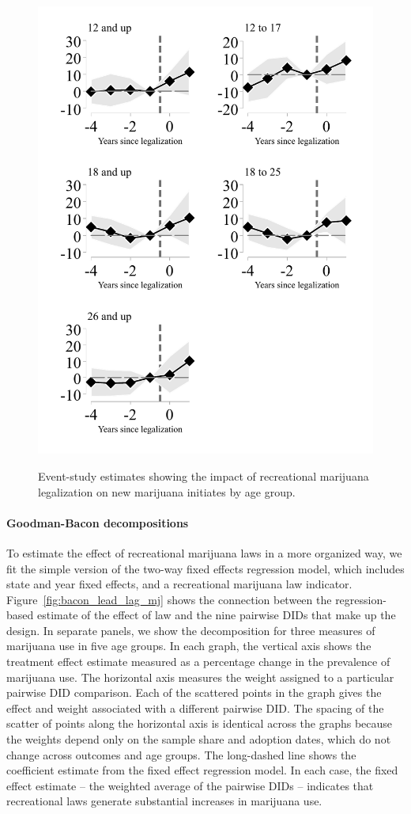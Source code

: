 \documentclass[12pt]{article}%
\begin{document}
\begin{figure}[h]
    \caption{Event-study estimates showing the impact of recreational marijuana legalization on new marijuana initiates by age group.}
    \includegraphics[width=.75\linewidth]{../output/plots/bw-event-study-estimates-ln-mj_first_use-bw.pdf}
    \label{fig:leads-and-lags-mj-first-use}
\end{figure}

\paragraph{Goodman-Bacon decompositions}
To estimate the effect of recreational marijuana laws in a more organized way, we fit the simple version of the two-way fixed effects regression model, which includes state and year fixed effects, and a recreational marijuana law indicator. 
Figure~\ref{fig:bacon_lead_lag_mj} shows the connection between the regression-based estimate of the effect of law and the nine pairwise DIDs that make up the design. 
In separate panels, we show the decomposition for three measures of marijuana use in five age groups.  In each graph, the vertical axis shows the treatment effect estimate measured as a percentage change in the prevalence of marijuana use. The horizontal axis measures the weight assigned to a particular pairwise DID comparison. Each of the scattered points in the graph gives the effect and weight associated with a different pairwise DID. The spacing of the scatter of points along the horizontal axis is identical across the graphs because the weights depend only on the sample share and adoption dates, which do not change across outcomes and age groups. The long-dashed line shows the coefficient estimate from the fixed effect regression model.
In each case, the fixed effect estimate – the weighted average of the pairwise DIDs – indicates that recreational laws generate substantial increases in marijuana use.
\end{document}
